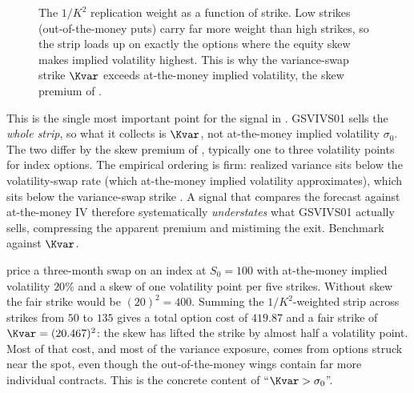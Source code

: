 \begin{figure}[ht]
\centering
{}
\caption{The $1/K^2$ replication weight as a function of strike. Low strikes (out-of-the-money puts) carry far more weight than high strikes, so the strip loads up on exactly the options where the equity skew makes implied volatility highest. This is why the variance-swap strike $\Kvar$ exceeds at-the-money implied volatility, the skew premium of .}
\label{fig:gsvivs:weight}
\end{figure}

\begin{warning}
This is the single most important point for the signal in . GSVIVS01 sells the \emph{whole strip}, so what it collects is $\Kvar$, not at-the-money implied volatility $\sigma_0$. The two differ by the skew premium of , typically one to three volatility points for index options. The empirical ordering is firm: realized variance sits below the volatility-swap rate (which at-the-money implied volatility approximates), which sits below the variance-swap strike \citep{CarrWu2009}. A signal that compares the forecast against at-the-money IV therefore systematically \emph{understates} what GSVIVS01 actually sells, compressing the apparent premium and mistiming the exit. Benchmark against $\Kvar$.
\end{warning}

\begin{workedexample}
\citet[Table~1, p.~21]{Demeterfi1999} price a three-month swap on an index at $S_0 = 100$ with at-the-money implied volatility $20\%$ and a skew of one volatility point per five strikes. Without skew the fair strike would be $(20)^2 = 400$. Summing the $1/K^2$-weighted strip across strikes from $50$ to $135$ gives a total option cost of $419.87$ and a fair strike of $\Kvar = (20.467)^2$: the skew has lifted the strike by almost half a volatility point. Most of that cost, and most of the variance exposure, comes from options struck near the spot, even though the out-of-the-money wings contain far more individual contracts. This is the concrete content of ``$\Kvar > \sigma_0$''.
\end{workedexample}

